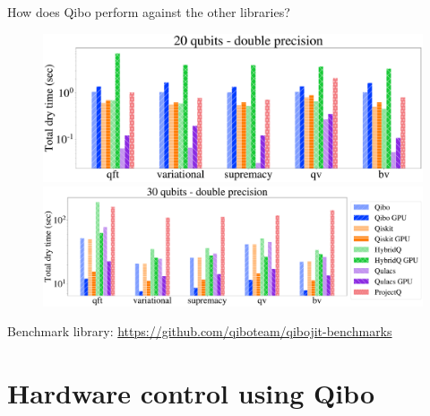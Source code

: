 \documentclass[11p,aspectratio=169]{beamer}
\begin{document}
\begin{frame}{How does Qibo perform against the other libraries?}
    \begin{figure}
        \centering
        \includegraphics[height=0.4\textheight]{figures/libraries_double_20qubits_total_dry_time.pdf}
        \includegraphics[height=0.31\textheight]{figures/libraries_double_30qubits_total_dry_time.pdf}
    \end{figure}
    Benchmark library: \url{https://github.com/qiboteam/qibojit-benchmarks}
    
\end{frame}

\section{Hardware control using Qibo}



    
\end{document}
